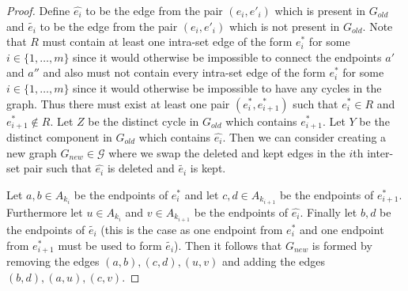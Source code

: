 \documentclass{article}
\theoremstyle{definition}
\newcommand{\GraphSet}{\mathcal{G}}
\begin{document}
\begin{proof}
    Define $\hat{e_i}$ to be the edge from the pair $(e_i, e'_i)$ which is present in $G_{old}$ and $\tilde{e_i}$ to be the edge from the pair $(e_i, e'_i)$ which is not present in $G_{old}$.
    Note that $R$ must contain at least one intra-set edge of the form $e^*_i$ for some $i \in \{1, \dots, m\}$ since it would otherwise be impossible to connect the endpoints $a'$ and $a''$ and also must not contain every intra-set edge of the form $e^*_i$ for some $i \in \{1, \dots, m\}$ since it would otherwise be impossible to have any cycles in the graph.
    Thus there must exist at least one pair $(e^*_i, e^*_{i+1})$ such that $e^*_i \in R$ and $e^*_{i+1} \notin R$.
    Let $Z$ be the distinct cycle in $G_{old}$ which contains $e^*_{i+1}$.
    Let $Y$ be the distinct component in $G_{old}$ which contains $\hat{e_i}$.
    Then we can consider creating a new graph $G_{new} \in \GraphSet$ where we swap the deleted and kept edges in the $i$th inter-set pair such that $\hat{e_i}$ is deleted and $\tilde{e_i}$ is kept.
    
    Let $a,b \in A_{k_i}$ be the endpoints of $e^*_i$ and let $c,d \in A_{k_{i+1}}$ be the endpoints of $e^*_{i+1}$.
    Furthermore let $u \in A_{k_i}$ and $v \in A_{k_{i+1}}$ be the endpoints of $\hat{e_i}$.
    Finally let $b,d$ be the endpoints of $\tilde{e_i}$ (this is the case as one endpoint from $e^*_i$ and one endpoint from $e^*_{i+1}$ must be used to form $\tilde{e_i}$).
    Then it follows that $G_{new}$ is formed by removing the edges $(a,b),(c,d),(u,v)$ and adding the edges $(b,d),(a,u),(c,v)$.


\end{proof}
\end{document}

